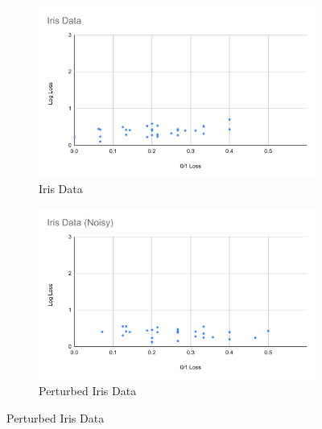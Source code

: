 \documentclass[twoside,11pt]{article}
\begin{document}
  
\begin{figure}[h!]
 \centering
   \begin{subfigure}[b]{0.45\linewidth}
    \includegraphics[width=\linewidth]{images/Iris.pdf}
    \caption{Iris Data}
  \end{subfigure}
  \begin{subfigure}[b]{0.45\linewidth}
    \includegraphics[width=\linewidth]{images/Iris(noise).pdf}
    \caption{Perturbed Iris Data}
  \end{subfigure}
  

\end{figure}
\end{document}
